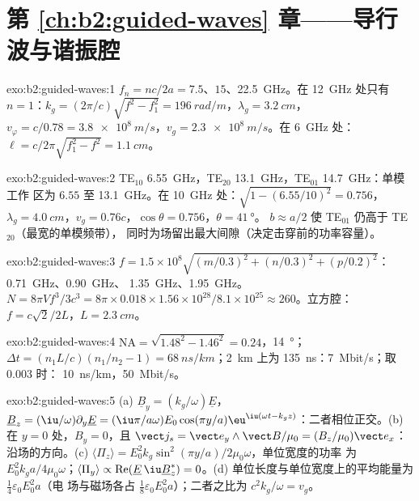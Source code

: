 \section*{第 \ref{ch:b2:guided-waves} 章——导行波与谐振腔}

\begin{solution}{exo:b2:guided-waves:1}
$f_n = nc/2a = 7.5$、$15$、\qty{22.5}{GHz}。在 \qty{12}{GHz} 处只有 $n = 1$：$k_g =
(2\pi/c)\sqrt{f^2 - f_1^2} = \qty{196}{rad/m}$，$\lambda_g = \qty{3.2}{cm}$，$v_\varphi = c/0.78
= \qty{3.8e8}{m/s}$，$v_g = \qty{2.3e8}{m/s}$。在 \qty{6}{GHz} 处：$\ell = c/2\pi\sqrt{f_1^2 -
f^2} = \qty{1.1}{cm}$。
\end{solution}

\begin{solution}{exo:b2:guided-waves:2}
TE$_{10}$ \qty{6.55}{GHz}，TE$_{20}$ \qty{13.1}{GHz}，TE$_{01}$ \qty{14.7}{GHz}：单模工作
区为 $6.55$ 至 \qty{13.1}{GHz}。在 \qty{10}{GHz} 处：$\sqrt{1 - (6.55/10)^2} =
0.756$，$\lambda_g = \qty{4.0}{cm}$，$v_g = 0.76c$，$\cos\theta = 0.756$，$\theta = \qty{41}{\degree}$。
$b \approx a/2$ 使 TE$_{01}$ 仍高于 TE$_{20}$（最宽的单模频带），
同时为场留出最大间隙（决定击穿前的功率容量）。
\end{solution}

\begin{solution}{exo:b2:guided-waves:3}
$f = 1.5 \times 10^8\sqrt{(m/0.3)^2 + (n/0.3)^2 + (p/0.2)^2}$：\qty{0.71}{GHz}、\qty{0.90}{GHz}、
\qty{1.35}{GHz}、\qty{1.95}{GHz}。$N = 8\pi Vf^3/3c^3 = 8\pi \times 0.018 \times 1.56 \times 10^{28}/
8.1 \times 10^{25} \approx 260$。立方腔：$f = c\sqrt2/2L$，$L = \qty{2.3}{cm}$。
\end{solution}

\begin{solution}{exo:b2:guided-waves:4}
$\mathrm{NA} = \sqrt{1.48^2 - 1.46^2} = 0.24$，\qty{14}{\degree}；$\Delta t = (n_1L/c)(n_1/n_2
- 1) = \qty{68}{ns/km}$；\qty{2}{km} 上为 \qty{135}{ns}：\qty{7}{Mbit/s}；取 $0.003$ 时：
\qty{10}{ns/km}，\qty{50}{Mbit/s}。
\end{solution}

\begin{solution}{exo:b2:guided-waves:5}
(a) $\underline B_y = (k_g/\omega)\underline E$，$\underline B_z = (\iu/\omega)\partial_y\underline E = (\iu\pi/a\omega)
E_0\cos(\pi y/a)\eu^{\iu(\omega t - k_gz)}$：二者相位正交。(b) 在 $y = 0$ 处，$B_y = 0$，且
$\vect j_s = \vect e_y\wedge\vect B/\mu_0 = (B_z/\mu_0)\vect e_x$：沿场的方向。(c)
$\langle\Pi_z\rangle = E_0^2k_g\sin^2(\pi y/a)/2\mu_0\omega$，单位宽度的功率
为 $E_0^2k_ga/4\mu_0\omega$；$\langle\Pi_y\rangle \propto \operatorname{Re}(\underline E\,\iu\underline B_z^*)
= 0$。(d) 单位长度与单位宽度上的平均能量为 $\tfrac14\varepsilon_0E_0^2a$（电
场与磁场各占 $\tfrac18\varepsilon_0E_0^2a$）；二者之比为 $c^2k_g/\omega = v_g$。
\end{solution}

